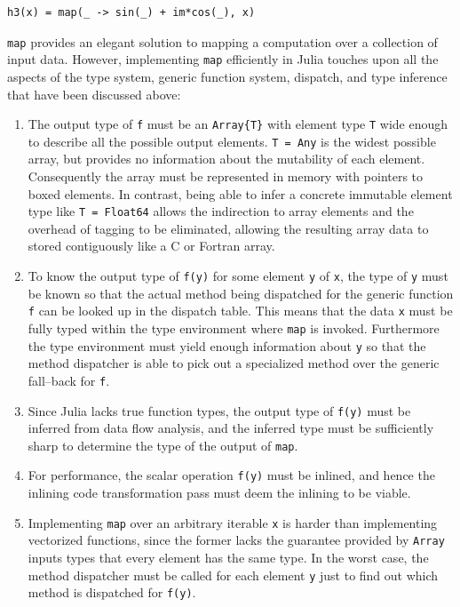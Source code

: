 \documentclass[pldi]{sigplanconf-pldi15}
\begin{document}
\begin{lstlisting}
h3(x) = map(_ -> sin(_) + im*cos(_), x)
\end{lstlisting}
%
\verb|map| provides an elegant solution to mapping a computation over a
collection of input data. However, implementing \verb|map| efficiently in Julia
touches upon all the aspects of the type system, generic function system,
dispatch, and type inference that have been discussed above:

\begin{enumerate}

	\item The output type of \verb|f| must be an \verb|Array{T}| with
	element type \verb|T| wide enough to describe all the possible output
	elements. \verb|T = Any| is the widest possible array, but provides no
	information about the mutability of each element. Consequently the
	array must be represented in memory with pointers to boxed elements. In
	contrast, being able to infer a concrete immutable element type like
	\verb|T = Float64| allows the indirection to array elements and the
	overhead of tagging to be eliminated, allowing the resulting array data
	to stored contiguously like a C or Fortran array.

	\item To know the output type of \verb|f(y)| for some element \verb|y|
	of \verb|x|, the type of \verb|y| must be known so that the actual
	method being dispatched for the generic function \verb|f| can be looked
	up in the dispatch table. This means that the data \verb|x| must be
	fully typed within the type environment where \verb|map| is invoked.
	Furthermore the type environment must yield enough information about
	\verb|y| so that the method dispatcher is able to pick out a
	specialized method over the generic fall--back for \verb|f|.

	\item Since Julia lacks true function types, the output type of
	\verb|f(y)| must be inferred from data flow analysis, and the inferred
	type must be sufficiently sharp to determine the type of the output of
	\verb|map|.

	\item For performance, the scalar operation \verb|f(y)| must be
	inlined, and hence the inlining code transformation pass must deem the
	inlining to be viable.

	\item Implementing \verb|map| over an arbitrary iterable \verb|x| is
	harder than implementing vectorized functions, since the former lacks
	the guarantee provided by \verb|Array| inputs types that every element
	has the same type. In the worst case, the method dispatcher must be
	called for each element \verb|y| just to find out which method is
	dispatched for \verb|f(y)|.

\end{enumerate}
\end{document}
